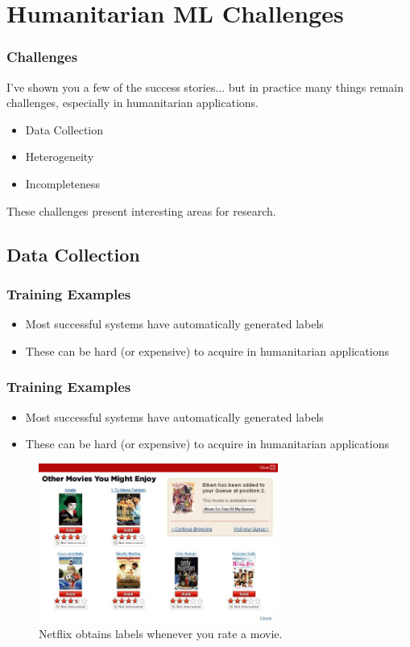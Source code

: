 \documentclass[10pt,mathserif]{beamer}
\begin{document}
\section{Humanitarian ML Challenges}
\label{sec:label}

\begin{frame}
  \frametitle{Challenges}
  I've shown you a few of the success stories... but in practice many things
  remain challenges, especially in humanitarian applications.
  \begin{itemize}
  \item Data Collection
  \item Heterogeneity
  \item Incompleteness
  \end{itemize} 
  These challenges present interesting areas for research.
\end{frame}

\subsection{Data Collection}
\label{subsec:label}

\begin{frame}
  \frametitle{Training Examples}
  \begin{itemize}
  \item Most successful systems have automatically generated labels
  \item These can be hard (or expensive) to acquire in humanitarian applications
  \end{itemize} 
\end{frame}

\begin{frame}
  \frametitle{Training Examples}
  \begin{itemize}
  \item Most successful systems have automatically generated labels
  \item These can be hard (or expensive) to acquire in humanitarian applications
  \end{itemize} 
  \begin{figure}[ht]
    \centering
    \includegraphics[width=0.7\textwidth]{figures/netflix_abstraction}
    \caption{Netflix obtains labels whenever you rate a movie. \label{fig:label} }
  \end{figure}
\end{frame}
\end{document}

